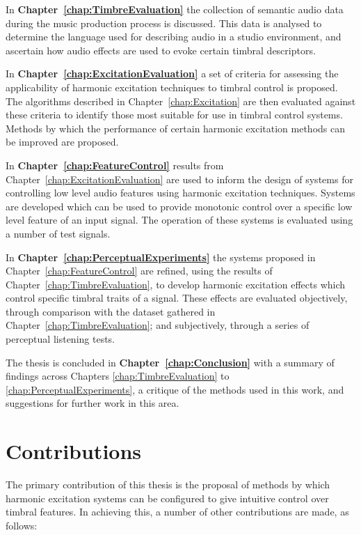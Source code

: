 	In {\bf{Chapter~\ref{chap:TimbreEvaluation}}} the collection of semantic audio data during the music production
	process is discussed. This data is analysed to determine the language used for describing audio in a studio
	environment, and ascertain how audio effects are used to evoke certain timbral descriptors.

	In {\bf{Chapter~\ref{chap:ExcitationEvaluation}}} a set of criteria for assessing the applicability of harmonic
	excitation techniques to timbral control is proposed. The algorithms described in Chapter~\ref{chap:Excitation} are
	then evaluated against these criteria to identify those most suitable for use in timbral control systems.  Methods
	by which the performance of certain harmonic excitation methods can be improved are proposed.

	In {\bf{Chapter~\ref{chap:FeatureControl}}} results from Chapter~\ref{chap:ExcitationEvaluation} are used to inform
	the design of systems for controlling low level audio features using harmonic excitation techniques. Systems are
	developed which can be used to provide monotonic control over a specific low level feature of an input signal. The
	operation of these systems is evaluated using a number of test signals.

	In {\bf{Chapter~\ref{chap:PerceptualExperiments}}} the systems proposed in Chapter~\ref{chap:FeatureControl} are
	refined, using the results of Chapter~\ref{chap:TimbreEvaluation}, to develop harmonic excitation effects which
	control specific timbral traits of a signal. These effects are evaluated objectively, through comparison with the
	dataset gathered in Chapter~\ref{chap:TimbreEvaluation}; and subjectively, through a series of perceptual listening
	tests.

	The thesis is concluded in {\bf{Chapter~\ref{chap:Conclusion}}} with a summary of findings across Chapters
	\ref{chap:TimbreEvaluation} to \ref{chap:PerceptualExperiments}, a critique of the methods used in this work, and
	suggestions for further work in this area.

\section{Contributions}
\label{sec:Introduction-Contributions}
	The primary contribution of this thesis is the proposal of methods by which harmonic excitation systems can be
	configured to give intuitive control over timbral features. In achieving this, a number of other contributions are
	made, as follows:

